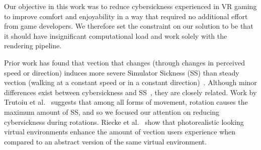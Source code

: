 \documentclass{vgtc}                          %
\begin{document}






Our objective in this work was to reduce cybersickness experienced in VR gaming to improve comfort and enjoyability in a way that required no additional effort from game developers. We therefore set the constraint on our solution to be that it should have insignificant computational load and work solely with the rendering pipeline.

Prior work has found that vection that changes (through changes in perceived speed or direction) induces more severe Simulator Sickness (SS) than steady vection (walking at a constant speed or in a constant direction)~\cite{Bonato2008}. Although minor differences exist between cybersickness and SS~\cite{stanney1997cybersickness}, they are closely related. Work by Trutoiu et al.~\cite{Trutoiu2009} suggests that among all forms of movement, rotation causes the maximum amount of SS, and so we focused our attention on reducing cybersickness during rotations. Riecke et al.~\cite{riecke2006cognitive} show that photorealistic looking virtual environments enhance the amount of vection users experience when compared to an abstract version of the same virtual environment.
\end{document}
